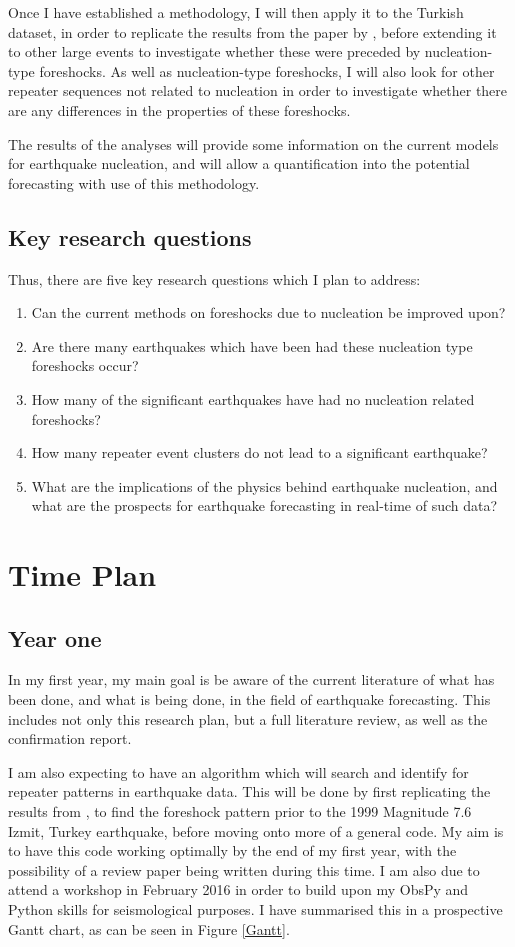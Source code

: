 \documentclass[12pt]{report}
\begin{document}
Once I have established a methodology, I will then apply it to the Turkish dataset, in order to replicate the results from the paper by \cite{Bouchon2011}, before extending it to other large events to investigate whether these were preceded by nucleation-type foreshocks. As well as nucleation-type foreshocks, I will also look for other repeater sequences not related to nucleation in order to investigate whether there are any differences in the properties of these foreshocks.

The results of the analyses will provide some information on the current models for earthquake nucleation, and will allow a quantification into the potential forecasting with use of this methodology.

\section{Key research questions}
Thus, there are five key research questions which I plan to address:
\begin{enumerate}
	\item Can the current methods on foreshocks due to nucleation be improved upon? 
	\item Are there many earthquakes which have been had these nucleation type foreshocks occur?
	\item How many of the significant earthquakes have had no nucleation related foreshocks?
	\item How many repeater event clusters do not lead to a significant earthquake?
	\item What are the implications of the physics behind earthquake nucleation, and what are the prospects for earthquake forecasting in real-time of such data?
\end{enumerate}  

\chapter{Time Plan}

\section{Year one}
In my first year, my main goal is be aware of the current literature of what has been done, and what is being done, in the field of earthquake forecasting. This includes not only this research plan, but a full literature review, as well as the confirmation report. 

I am also expecting to have an algorithm which will search and identify for repeater patterns in earthquake data. This will be done by first replicating the results from \cite{Bouchon2011}, to find the foreshock pattern prior to the 1999 Magnitude 7.6 Izmit, Turkey earthquake, before moving onto more of a general code. My aim is to have this code working optimally by the end of my first year, with the possibility of a review paper being written during this time. I am also due to attend a workshop in February 2016 in order to build upon my ObsPy and Python skills for seismological purposes. I have summarised this in a prospective Gantt chart, as can be seen in Figure \ref{Gantt}. 
\end{document}
